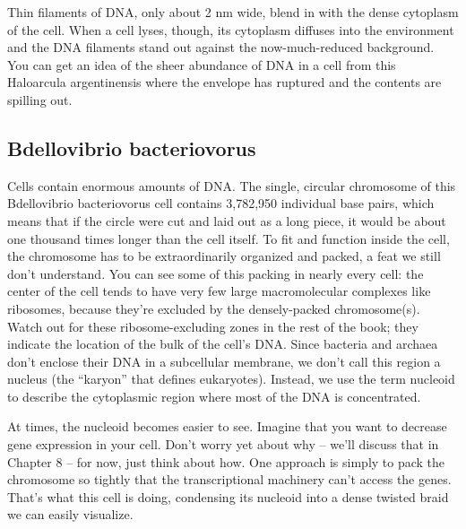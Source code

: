 \documentclass[]{book}
\begin{document}
Thin filaments of DNA, only about 2 nm wide, blend in with the dense
cytoplasm of the cell. When a cell lyses, though, its cytoplasm diffuses
into the environment and the DNA filaments stand out against the
now-much-reduced background. You can get an idea of the sheer abundance
of DNA in a cell from this Haloarcula argentinensis where the envelope
has ruptured and the contents are spilling out.

\subsection{Bdellovibrio
bacteriovorus}\label{bdellovibrio-bacteriovorus}

Cells contain enormous amounts of DNA. The single, circular chromosome
of this Bdellovibrio bacteriovorus cell contains 3,782,950 individual
base pairs, which means that if the circle were cut and laid out as a
long piece, it would be about one thousand times longer than the cell
itself. To fit and function inside the cell, the chromosome has to be
extraordinarily organized and packed, a feat we still don't understand.
You can see some of this packing in nearly every cell: the center of the
cell tends to have very few large macromolecular complexes like
ribosomes, because they're excluded by the densely-packed chromosome(s).
Watch out for these ribosome-excluding zones in the rest of the book;
they indicate the location of the bulk of the cell's DNA. Since bacteria
and archaea don't enclose their DNA in a subcellular membrane, we don't
call this region a nucleus (the ``karyon'' that defines eukaryotes).
Instead, we use the term nucleoid to describe the cytoplasmic region
where most of the DNA is concentrated.

At times, the nucleoid becomes easier to see. Imagine that you want to
decrease gene expression in your cell. Don't worry yet about why --
we'll discuss that in Chapter 8 -- for now, just think about how. One
approach is simply to pack the chromosome so tightly that the
transcriptional machinery can't access the genes. That's what this cell
is doing, condensing its nucleoid into a dense twisted braid we can
easily visualize.


\end{document}
